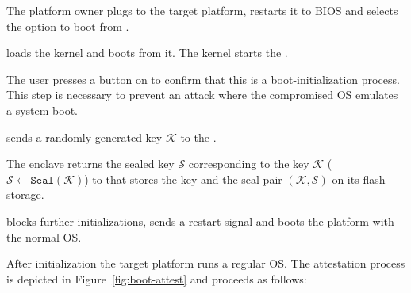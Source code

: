 \begin{mylist}
  \item[\one] The platform owner plugs \device to the target platform, restarts it to BIOS and selects the option to boot from \device.
  \item[\two] \device loads the \name kernel and boots from it. The \name kernel starts the \nameclave.
  \item[\three] The user presses a button on \device to confirm that this is a boot-initialization process. This step is necessary to prevent an attack where the compromised OS emulates a system boot.
  \item[\four] \device sends a randomly generated key $\mathcal{K}$ to the \nameclave.
  \item[\five] The enclave returns the sealed key $\mathcal{S}$ corresponding to the key $\mathcal{K}$ ($\mathcal{S}\leftarrow\texttt{Seal}(\mathcal{K})$) to \device that stores the key and the seal pair $(\mathcal{K}, \mathcal{S})$ on its flash storage.
  \item[\six] \device blocks further initializations, sends a restart signal and boots the platform with the normal OS.
\end{mylist}

\ifusenix
\vspace{-15pt}
\else
\fi
{} After initialization the target platform runs a regular OS. The attestation process is depicted in Figure~\ref{fig:boot-attest} and proceeds as follows:

